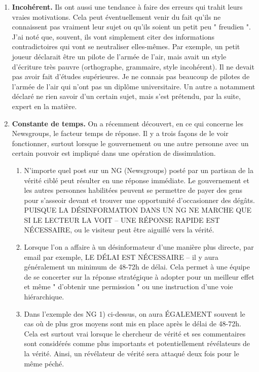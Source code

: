 \documentclass[11pt,twoside,a4paper]{article}
\begin{document}
\begin{enumerate}
		\clearpage
	\item \textbf{Incoh{\'e}rent. } Ils ont aussi une tendance {\`a} faire des erreurs qui trahit leurs vraies motivations. Cela peut {\'e}ventuellement venir du fait qu'ils ne connaissent pas vraiment leur sujet ou qu'ils soient un petit peu " freudien ". J'ai not{\'e} que, souvent, ils vont simplement citer des informations contradictoires qui vont se neutraliser elles-m{\^e}mes. Par exemple, un petit joueur d{\'e}clarait {\^e}tre un pilote de l'arm{\'e}e de l'air, mais avait un style d'{\'e}criture tr{\`e}s pauvre (orthographe, grammaire, style incoh{\'e}rent). Il ne devait pas avoir fait d'{\'e}tudes sup{\'e}rieures. Je ne connais pas beaucoup de pilotes de l'arm{\'e}e de l'air qui n'ont pas un dipl{\^o}me universitaire. Un autre a notamment d{\'e}clar{\'e} ne rien savoir d'un certain sujet, mais s'est pr{\'e}tendu, par la suite, expert en la mati{\`e}re.
	\item \textbf{Constante de temps. } On a r{\'e}cemment d{\'e}couvert, en ce qui concerne les Newsgroups, le facteur temps de r{\'e}ponse. Il y a trois fa\c{c}ons de le voir fonctionner, surtout lorsque le gouvernement ou une autre personne avec un certain pouvoir est impliqu{\'e} dans une op{\'e}ration de dissimulation. 
	\begin{enumerate}
		\item[a] N'importe quel post sur un NG (Newsgroups) post{\'e} par un partisan de la v{\'e}rit{\'e} cibl{\'e} peut r{\'e}sulter en une r{\'e}ponse imm{\'e}diate. Le gouvernement et les autres personnes habilit{\'e}es peuvent se permettre de payer des gens pour s'asseoir devant et trouver une opportunit{\'e} d'occasionner des d{\'e}g{\^a}ts. PUISQUE LA D{\'E}SINFORMATION DANS UN NG NE MARCHE QUE SI LE LECTEUR LA VOIT -- UNE R{\'E}PONSE RAPIDE EST N{\'E}CESSAIRE, ou le visiteur peut {\^e}tre aiguill{\'e} vers la v{\'e}rit{\'e}. 
		\item[b] Lorsque l'on a affaire {\`a} un d{\'e}sinformateur d'une mani{\`e}re plus directe, par email par exemple, LE D{\'E}LAI EST N{\'E}CESSAIRE -- il y aura g{\'e}n{\'e}ralement un minimum de 48-72h de d{\'e}lai. Cela permet {\`a} une {\'e}quipe de se concerter sur la r{\'e}ponse strat{\'e}gique {\`a} adopter pour un meilleur effet et m{\^e}me " d'obtenir une permission " ou une instruction d'une voie hi{\'e}rarchique.
		\item[c] Dans l'exemple des NG 1) ci-dessus, on aura {\'E}GALEMENT souvent le cas o{\`u} de plus gros moyens sont mis en place apr{\`e}s le d{\'e}lai de 48-72h. Cela est surtout vrai lorsque le chercheur de v{\'e}rit{\'e} et ses commentaires sont consid{\'e}r{\'e}s comme plus importants et potentiellement r{\'e}v{\'e}lateurs de la v{\'e}rit{\'e}. Ainsi, un r{\'e}v{\'e}lateur de v{\'e}rit{\'e} sera attaqu{\'e} deux fois pour le m{\^e}me p{\'e}ch{\'e}.
	\end{enumerate}
\end{enumerate}
\setlength\parindent{0pt}
\end{document}
